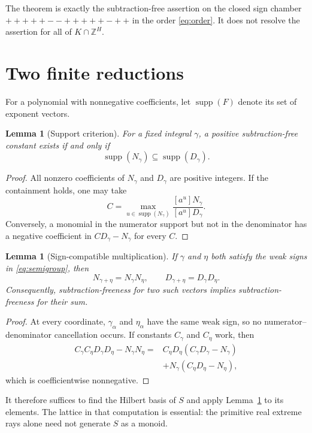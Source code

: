 \documentclass[11pt]{article}
\newtheorem{lemma}[theorem]{Lemma}
\theoremstyle{definition}
\newcommand{\supp}{\operatorname{supp}}
\begin{document}
The theorem is exactly the subtraction-free assertion on the closed sign
chamber \(+++++--+++++-++\) in the order \eqref{eq:order}.  It does not
resolve the assertion for all of $K\cap\mathbb Z^H$.

\section{Two finite reductions}

For a polynomial with nonnegative coefficients, let $\supp(F)$ denote its
set of exponent vectors.

\begin{lemma}[Support criterion]\label{lem:support}
For a fixed integral $\gamma$, a positive subtraction-free constant exists
if and only if
\[
 \supp(N_\gamma)\subseteq\supp(D_\gamma).
\]
\end{lemma}

\begin{proof}
All nonzero coefficients of $N_\gamma$ and $D_\gamma$ are positive
integers.  If the containment holds, one may take
\[
 C=\max_{u\in\supp(N_\gamma)}
 \frac{[a^u]N_\gamma}{[a^u]D_\gamma}.
\]
Conversely, a monomial in the numerator support but not in the denominator
has a negative coefficient in $CD_\gamma-N_\gamma$ for every $C$.
\end{proof}

\begin{lemma}[Sign-compatible multiplication]\label{lem:multiply}
If $\gamma$ and $\eta$ both satisfy the weak signs in
\eqref{eq:semigroup}, then
\[
 N_{\gamma+\eta}=N_\gamma N_\eta,
 \qquad D_{\gamma+\eta}=D_\gamma D_\eta.
\]
Consequently, subtraction-freeness for two such vectors implies
subtraction-freeness for their sum.
\end{lemma}

\begin{proof}
At every coordinate, $\gamma_\alpha$ and $\eta_\alpha$ have the same weak
sign, so no numerator--denominator cancellation occurs.  If constants
$C_\gamma$ and $C_\eta$ work, then
\begin{align*}
 C_\gamma C_\eta D_\gamma D_\eta-N_\gamma N_\eta
 ={}&C_\eta D_\eta(C_\gamma D_\gamma-N_\gamma)\\
   &+N_\gamma(C_\eta D_\eta-N_\eta),
\end{align*}
which is coefficientwise nonnegative.
\end{proof}

It therefore suffices to find the Hilbert basis of $S$ and apply
Lemma~\ref{lem:support} to its elements.  The lattice in that computation
is essential: the primitive real extreme rays alone need not generate
$S$ as a monoid.
\end{document}
